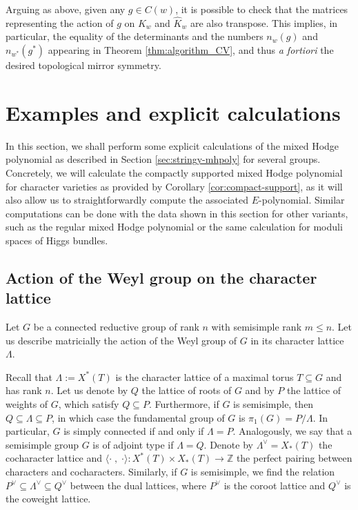 \documentclass[11pt,english]{amsart}
\numberwithin{equation}{section}
\numberwithin{figure}{section}
\theoremstyle{plain}
\theoremstyle{plain}
\theoremstyle{definition}
\theoremstyle{remark}
\begin{document}
    Arguing as above, given any $g \in C(w)$, it is possible to check that the matrices representing the action of $g$ on $K_w$ and $\hat{K}_w$ are also transpose. This implies, in particular, the equality of the determinants and the numbers $n_{w}(g)$ and $n_{w^*}(g^*)$ appearing in Theorem \ref{thm:algorithm_CV}, and thus \textit{a fortiori} the desired topological mirror symmetry.



\section{Examples and explicit calculations}
\label{sec:examples}

In this section, we shall perform some explicit calculations of the mixed Hodge polynomial as described in Section \ref{sec:stringy-mhpoly} for several groups. Concretely, we will calculate the compactly supported mixed Hodge polynomial for character varieties as provided by Corollary \ref{cor:compact-support}, as it will also allow us to straightforwardly compute the associated $E$-polynomial. Similar computations can be done with the data shown in this section for other variants, such as the regular mixed Hodge polynomial or the same calculation for moduli spaces of Higgs bundles.


\subsection{Action of the Weyl group on the character lattice}\label{sec:action_weyl}

 Let $G$ be a connected reductive group of rank $n$ with semisimple rank $m \le n$. Let us describe matricially the action of the Weyl group of $G$ in its character lattice $\Lambda$.

Recall that $\Lambda:=X^*(T)$ is the character lattice of a maximal torus $T \subseteq G$ and has rank $n$. Let us denote by $Q$ the lattice of roots of $G$ and by $P$ the lattice of weights of $G$, which satisfy $Q\subseteq P$. Furthermore, if $G$ is semisimple, then $Q \subseteq \Lambda \subseteq P$, in which case the fundamental group of $G$ is $\pi_1(G)=P/\Lambda$. In particular, $G$ is simply connected if and only if $\Lambda = P$. Analogously, we say that a semisimple group $G$ is of adjoint type if $\Lambda = Q$. Denote by $\Lambda^{\vee}=X_{\ast}(T)$ the cocharacter lattice and $\langle \cdot \; , \; \cdot \rangle: X^{\ast}(T)\times X_{\ast}(T)\rightarrow \mathbb{Z}$ the perfect pairing between characters and cocharacters. Similarly, if $G$ is semisimple, we find the relation $P^{\vee}\subseteq \Lambda^{\vee}\subseteq Q^{\vee}$ between the dual lattices, where $P^{\vee}$ is the coroot lattice and $Q^{\vee}$ is the coweight lattice. 
\end{document}
